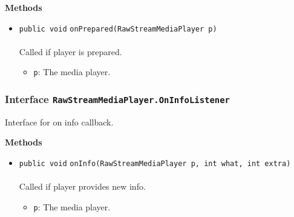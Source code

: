 \textbf{\sffamily Methods}
\begin{itemize}
\item \lstinline|public void| \lstinline|onPrepared|\lstinline|(RawStreamMediaPlayer p)|\\ \\[-0.6em]
Called if player is prepared.
\begin{itemize}
\item \lstinline|p|: The media player.
\end{itemize}



\end{itemize}

\subsubsection{Interface \lstinline|RawStreamMediaPlayer.OnInfoListener|}
Interface for on info callback. \\
\noindent\begin{minipage}[t]{5cm}
\vspace{0.3em}
\hspace*{2em}
\vspace{0.3em}
\end{minipage}





\textbf{\sffamily Methods}
\begin{itemize}
\item \lstinline|public void| \lstinline|onInfo|\lstinline|(RawStreamMediaPlayer p, int what, int extra)|\\ \\[-0.6em]
Called if player provides new info.
\begin{itemize}
\item \lstinline|p|: The media player.
\end{itemize}



\end{itemize}


